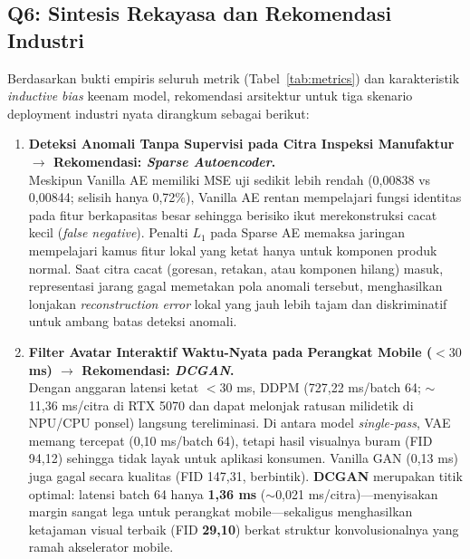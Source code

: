 \documentclass[11pt,a4paper]{article}
\begin{document}
\subsection{Q6: Sintesis Rekayasa dan Rekomendasi Industri}
Berdasarkan bukti empiris seluruh metrik (Tabel~\ref{tab:metrics}) dan karakteristik \textit{inductive bias} keenam model, rekomendasi arsitektur untuk tiga skenario deployment industri nyata dirangkum sebagai berikut:

\begin{enumerate}[leftmargin=1.4em, itemsep=3pt]
  \item \textbf{Deteksi Anomali Tanpa Supervisi pada Citra Inspeksi Manufaktur $\rightarrow$ Rekomendasi: \textit{Sparse Autoencoder}.}\\
  Meskipun Vanilla AE memiliki MSE uji sedikit lebih rendah (0,00838 vs 0,00844; selisih hanya 0,72\%), Vanilla AE rentan mempelajari fungsi identitas pada fitur berkapasitas besar sehingga berisiko ikut merekonstruksi cacat kecil (\textit{false negative}). Penalti $L_1$ pada Sparse AE memaksa jaringan mempelajari kamus fitur lokal yang ketat hanya untuk komponen produk normal. Saat citra cacat (goresan, retakan, atau komponen hilang) masuk, representasi jarang gagal memetakan pola anomali tersebut, menghasilkan lonjakan \textit{reconstruction error} lokal yang jauh lebih tajam dan diskriminatif untuk ambang batas deteksi anomali.

  \item \textbf{Filter Avatar Interaktif Waktu-Nyata pada Perangkat Mobile ($<30$ ms) $\rightarrow$ Rekomendasi: \textit{DCGAN}.}\\
  Dengan anggaran latensi ketat $<30$ ms, DDPM (727,22 ms/batch 64; $\sim$11,36 ms/citra di RTX 5070 dan dapat melonjak ratusan milidetik di NPU/CPU ponsel) langsung tereliminasi. Di antara model \textit{single-pass}, VAE memang tercepat (0,10 ms/batch 64), tetapi hasil visualnya buram (FID 94,12) sehingga tidak layak untuk aplikasi konsumen. Vanilla GAN (0,13 ms) juga gagal secara kualitas (FID 147,31, berbintik). \textbf{DCGAN} merupakan titik optimal: latensi batch 64 hanya \textbf{1,36 ms} ($\sim$0,021 ms/citra)---menyisakan margin sangat lega untuk perangkat mobile---sekaligus menghasilkan ketajaman visual terbaik (FID \textbf{29,10}) berkat struktur konvolusionalnya yang ramah akselerator mobile.


\end{enumerate}
\end{document}
